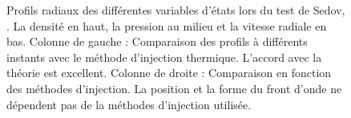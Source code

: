 \begin{figure}
\begin{minipage}[c]{.5\linewidth}
   \end{minipage}

        \caption[Test de Sedov - Profils]{Profils radiaux des différentes variables d'états lors du test de Sedov, . 
        La densité en haut, la pression au milieu et la vitesse radiale en bas.     
        Colonne de gauche :
        Comparaison des profils à différents instants avec le méthode d'injection thermique.
        L'accord avec la théorie est excellent.
        Colonne de droite :    
        Comparaison en fonction des méthodes d'injection. 
        La position et la forme du front d'onde ne dépendent pas de la méthodes d'injection utilisée.
 		\label{fig:sedov_profil}
 		}
\end{figure}

\begin{figure}

	\centering
	 \\


\end{figure}
